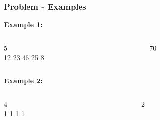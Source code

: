 \documentclass{beamer}
\begin{document}
\begin{frame}
	\frametitle{Problem - Examples}

	\textbf{Example 1:}
	\vspace{2mm}
	\begin{columns}
		\begin{column}{0.3\textwidth}
			\begin{tcolorbox}[fonttitle=\bfseries, title=Input]
				5\\
				12 23 45 25 8
			\end{tcolorbox}
		\end{column}
		\begin{column}{0.3\textwidth}
			\begin{tcolorbox}[fonttitle=\bfseries, title=Output]
				70\\
			\end{tcolorbox}
		\end{column}
	\end{columns}

	\vspace{4mm}

	\textbf{Example 2:}
	\vspace{2mm}
	\begin{columns}
		\begin{column}{0.3\textwidth}
			\begin{tcolorbox}[fonttitle=\bfseries, title=Input]
				4\\
				1 1 1 1
			\end{tcolorbox}
		\end{column}
		\begin{column}{0.3\textwidth}
			\begin{tcolorbox}[fonttitle=\bfseries, title=Output]
				2\\
			\end{tcolorbox}
		\end{column}
	\end{columns}
\end{frame}
\end{document}
